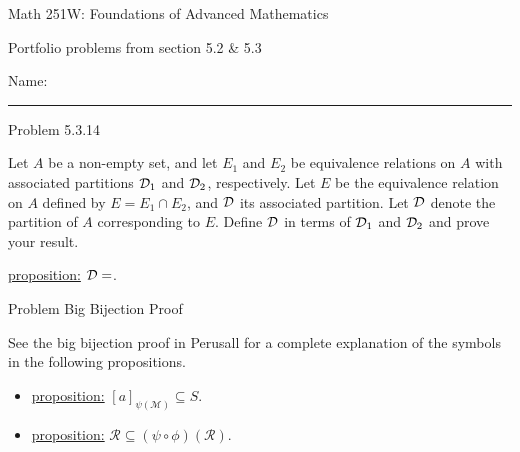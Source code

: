 \documentclass{article}
\theoremstyle{definition}
\newcommand{\D}{\ensuremath{{\cal D}}}
\newcommand{\M}{\mathcal{M}}
\newcommand{\com}{\psi\circ\phi}
\begin{document}
	\begin{center}
		\Large{Math 251W: Foundations of Advanced Mathematics}

		\normalsize  Portfolio problems from section 5.2 \& 5.3

		\hfill Name:

		\vspace{0.4cm}
		\hrule \vspace{0.4cm}


		\vspace{0.75cm}
	\end{center}




	\noindent Problem 5.3.14  \vspace{0.3cm}


	Let $A$ be a non-empty set, and let $E_1$ and $E_2$ be equivalence
	relations on $A$ with associated partitions $\D _1$ and $\D _2$,
	respectively. Let $E$ be the equivalence relation on $A$ defined by
	$E=E_1\cap E_2$, and $\D$ its associated partition. Let $\D$ denote the partition of $A$ corresponding to $E$. Define $\D$ in terms of $\D_1$ and $\D_2$ and prove your result.

	\underline{proposition:}  $\D =$.

	\vspace{.2cm}

	\vspace{.15cm}


	\vspace{1cm}


	\noindent Problem Big Bijection Proof\vspace{0.3cm}

	See the big bijection proof in Perusall for a complete explanation of the symbols in the following propositions.

	\begin{itemize}
		\item[a.] \underline{proposition:}  $[a]_{\psi(\M)}\subseteq S.$

		\vspace{.2cm}

		\item[b.] \underline{proposition:}  $\mathcal{R}\subseteq(\com)(\mathcal{R}).$

		\vspace{.2cm}

	\end{itemize}
\end{document}
